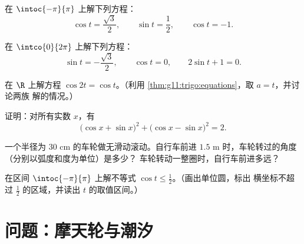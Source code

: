 \begin{exercise}[$\star\star$]\label{exo:g11:trigo:6}
在 $\intoc{-\pi}{\pi}$ 上解下列方程：
\[
\cos t = \frac{\sqrt3}{2}, \qquad
\sin t = \frac12, \qquad
\cos t = -1 .
\]
\end{exercise}

\begin{exercise}[$\star\star$]\label{exo:g11:trigo:7}
在 $\intco{0}{2\pi}$ 上解下列方程：
\[
\sin t = -\frac{\sqrt3}{2}, \qquad
\cos t = 0, \qquad
2\sin t + 1 = 0 .
\]
\end{exercise}

\begin{exercise}[$\star\star$]\label{exo:g11:trigo:8}
在 $\R$ 上解方程 $\cos 2t = \cos t$。（利用
\cref{thm:g11:trigo:equations}，取 $a = t$，并讨论两族
解的情况。）
\end{exercise}

\begin{exercise}[$\star\star$]\label{exo:g11:trigo:9}
证明：对所有实数 $x$，有
\[
\bigl(\cos x + \sin x\bigr)^2 + \bigl(\cos x - \sin x\bigr)^2 = 2 .
\]
\end{exercise}

\begin{exercise}[$\star\star$]\label{exo:g11:trigo:10}
一个半径为 $30$ cm 的车轮做无滑动滚动。自行车前进 $1.5$ m 时，车轮转过的角度
（分别以弧度和度为单位）是多少？
车轮转动一整圈时，自行车前进多远？
\end{exercise}

\begin{exercise}[$\star\star\star$]\label{exo:g11:trigo:11}
在区间 $\intoc{-\pi}{\pi}$ 上解不等式
$\cos t \leq \frac12$。（画出单位圆，标出
横坐标不超过 $\frac12$ 的区域，并读出
$t$ 的取值区间。）
\end{exercise}

\section{问题：摩天轮与潮汐}

